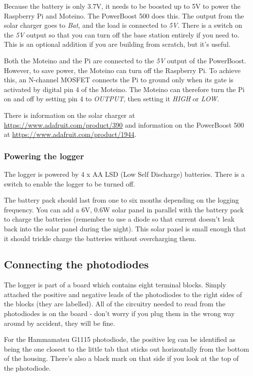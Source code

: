 \documentclass[10pt]{article}
\begin{document}
Because the battery is only 3.7V, it needs to be boosted up to 5V to power the Raspberry Pi and Moteino. The PowerBoost 500 does this. The output from the solar charger goes to \textit{Bat}, and the load is connected to \textit{5V}. There is a switch on the \textit{5V} output so that you can turn off the base station entirely if you need to. This is an optional addition if you are building from scratch, but it's useful.

Both the Moteino and the Pi are connected to the \textit{5V} output of the PowerBoost. However, to save power, the Moteino can turn off the Raspberry Pi. To achieve this, an N-channel MOSFET connects the Pi to ground only when its gate is activated by digital pin 4 of the Moteino. The Moteino can therefore turn the Pi on and off by setting pin 4 to \textit{OUTPUT}, then setting it \textit{HIGH} or \textit{LOW}.

There is information on the solar charger at \url{https://www.adafruit.com/product/390} and information on the PowerBoost 500 at \url{https://www.adafruit.com/product/1944}.

\subsubsection{Powering the logger}

The logger is powered by 4 x AA LSD (Low Self Discharge) batteries. There is a switch to enable the logger to be turned off.

The battery pack should last from one to six months depending on the logging frequency. You can add a 6V, 0.6W solar panel in parallel with the battery pack to charge the batteries (remember to use a diode so that current doesn't leak back into the solar panel during the night). This solar panel is small enough that it should trickle charge the batteries without overcharging them.

\subsection{Connecting the photodiodes}

The logger is part of a board which contains eight terminal blocks. Simply attached the positive and negative leads of the photodiodes to the right sides of the blocks (they are labelled). All of the circuitry needed to read from the photodiodes is on the board - don't worry if you plug them in the wrong way around by accident, they will be fine.

For the Hammamatsu G1115 photodiode, the positive leg can be identified as being the one closest to the little tab that sticks out horizontally from the bottom of the housing. There's also a black mark on that side if you look at the top of the photodiode.
\end{document}
